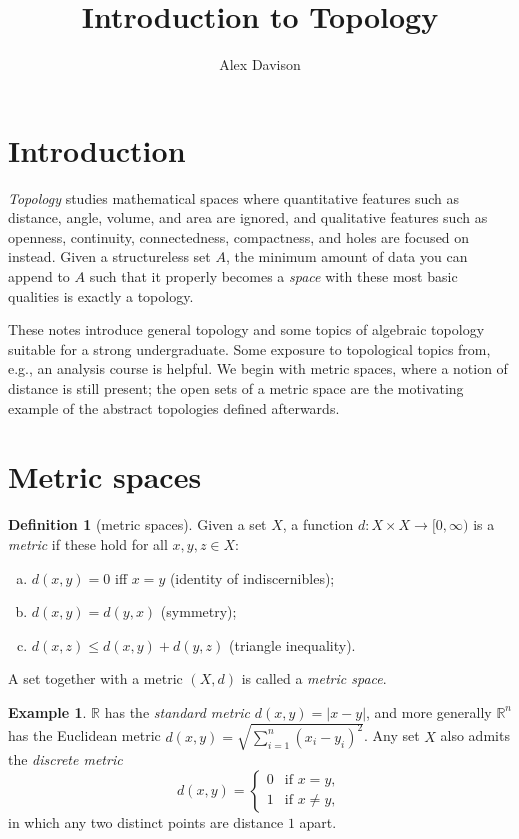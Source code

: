 \documentclass[11pt]{article}
\title{\textbf{Introduction to Topology}}
\author{Alex Davison}
\theoremstyle{definition}
\newtheorem{definition}{Definition}[section]
\newtheorem{example}{Example}[section]
\theoremstyle{remark}
\begin{document}
\maketitle

\tableofcontents

\section{Introduction}

\emph{Topology} studies mathematical spaces where quantitative features such as distance, angle, volume, and area are ignored, and qualitative features such as openness, continuity, connectedness, compactness, and holes are focused on instead. Given a structureless set $A$, the minimum amount of data you can append to $A$ such that it properly becomes a \emph{space} with these most basic qualities is exactly a topology.

These notes introduce general topology and some topics of algebraic topology suitable for a strong undergraduate. Some exposure to topological topics from, e.g., an analysis course is helpful. We begin with metric spaces, where a notion of distance is still present; the open sets of a metric space are the motivating example of the abstract topologies defined afterwards.

\section{Metric spaces}

\begin{definition}[metric spaces]
    Given a set $X$, a function $d : X \times X \to [0,\infty)$ is a \emph{metric} if these hold for all $x, y, z \in X$:
    \begin{enumerate}[(a)]
        \item $d(x, y) = 0$ iff $x = y$ (identity of indiscernibles);
        \item $d(x, y) = d(y, x)$ (symmetry);
        \item $d(x, z) \leq d(x, y) + d(y, z)$ (triangle inequality).
    \end{enumerate}
    A set together with a metric $(X, d)$ is called a \emph{metric space}.
\end{definition}

\begin{example}
    $\mathbb{R}$ has the \emph{standard metric} $d(x, y) = |x - y|$, and more generally $\mathbb{R}^n$ has the Euclidean metric $d(x, y) = \sqrt{\sum_{i = 1}^n (x_i - y_i)^2}$. Any set $X$ also admits the \emph{discrete metric}
    \[
    d(x, y) =
    \begin{cases}
        0 & \text{if } x = y, \\
        1 & \text{if } x \neq y,
    \end{cases}
    \]
    in which any two distinct points are distance $1$ apart.
\end{example}
\end{document}
